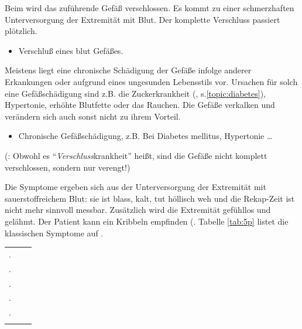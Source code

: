 {
Beim  wird das
zuführende Gefäß verschlossen. Es kommt zu einer schmerzhaften 
Unterversorgung der Extremität mit Blut. Der komplette
Verschluss passiert plötzlich. 
}
{
\begin{itemize}
    \item Verschluß eines blut Gefäßes.
\end{itemize}
}{}{}{}

{
Meistens liegt eine 
chronische Schädigung der Gefäße infolge anderer Erkankungen oder aufgrund eines ungesunden
Lebensstils vor. Ursachen für solch eine Gefäßschädigung
sind z.B. die Zuckerkrankheit (,
s.\ref{topic:diabetes}), Hypertonie, erhöhte Blutfette oder
das Rauchen. Die Gefäße verkalken und verändern sich auch sonst
nicht zu ihrem Vorteil.
}
{
\begin{itemize}
  \item Chronische Gefäßschädigung, z.B. Bei Diabetes mellitus, Hypertonie \ldots
\end{itemize}
}{}{}{}




 (: Obwohl es
"`\emph{Verschluss}krankheit"' heißt, sind die Gefäße nicht komplett
verschlossen, sondern nur verengt!)

\Layout{}{}{}{}{}{}{}

{
Die Symptome ergeben sich aus der Unterversorgung der
Extremität mit sauerstoffreichem Blut: sie ist blass,
kalt, tut höllisch weh und die Rekap-Zeit ist nicht
mehr sinnvoll messbar. Zusätzlich wird die Extremität
gefühllos und gelähmt. Der Patient kann ein Kribbeln
empfinden (. Tabelle \ref{tab:5p}
listet die klassischen Symptome auf .
}{
\label{tab:5p}

\begin{tabulary}{4cm}{CLL}
\midrule\addlinespace
{}. & \noindent{}        & \noindent{}
\\
. & \noindent{}        & \noindent{}
\\
. & \noindent{}    & \noindent{}
\\
. & \noindent{} & \noindent{}
\\
. & \noindent{}   & \noindent{}
\\\addlinespace\bottomrule
\end{tabulary}
}{}{}{}


